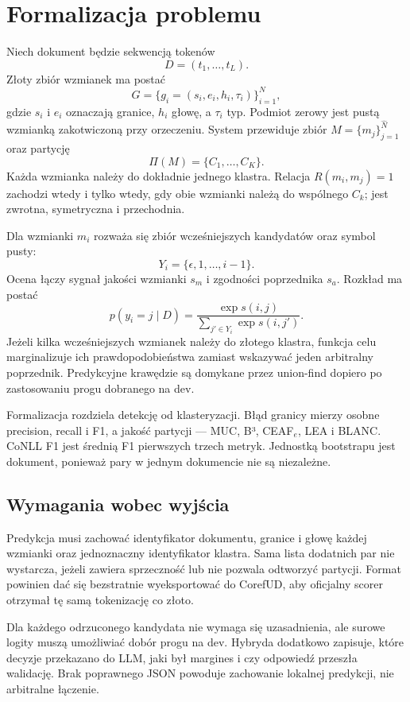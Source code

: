 \section{Formalizacja problemu}
\label{sec:formalizacja}

Niech dokument będzie sekwencją tokenów
\[
D=(t_1,\ldots,t_L).
\]
Złoty zbiór wzmianek ma postać
\[
G=\{g_i=(s_i,e_i,h_i,\tau_i)\}_{i=1}^{N},
\]
gdzie $s_i$ i $e_i$ oznaczają granice, $h_i$ głowę, a $\tau_i$ typ. Podmiot zerowy jest pustą wzmianką zakotwiczoną przy orzeczeniu. System przewiduje zbiór $M=\{m_j\}_{j=1}^{\hat N}$ oraz partycję
\[
\Pi(M)=\{C_1,\ldots,C_K\}.
\]
Każda wzmianka należy do dokładnie jednego klastra. Relacja $R(m_i,m_j)=1$ zachodzi wtedy i tylko wtedy, gdy obie wzmianki należą do wspólnego $C_k$; jest zwrotna, symetryczna i przechodnia.

Dla wzmianki $m_i$ rozważa się zbiór wcześniejszych kandydatów oraz symbol pusty:
\[
Y_i=\{\epsilon,1,\ldots,i-1\}.
\]
Ocena łączy sygnał jakości wzmianki $s_m$ i zgodności poprzednika $s_a$. Rozkład ma postać
\[
p(y_i=j\mid D)=
\frac{\exp s(i,j)}
{\sum_{j'\in Y_i}\exp s(i,j')}.
\]
Jeżeli kilka wcześniejszych wzmianek należy do złotego klastra, funkcja celu marginalizuje ich prawdopodobieństwa zamiast wskazywać jeden arbitralny poprzednik. Predykcyjne krawędzie są domykane przez union-find dopiero po zastosowaniu progu dobranego na dev.

Formalizacja rozdziela detekcję od klasteryzacji. Błąd granicy mierzy osobne precision, recall i F1, a jakość partycji --- MUC, B³, CEAF$_e$, LEA i BLANC. CoNLL F1 jest średnią F1 pierwszych trzech metryk. Jednostką bootstrapu jest dokument, ponieważ pary w jednym dokumencie nie są niezależne.

\subsection{Wymagania wobec wyjścia}

Predykcja musi zachować identyfikator dokumentu, granice i głowę każdej wzmianki oraz jednoznaczny identyfikator klastra. Sama lista dodatnich par nie wystarcza, jeżeli zawiera sprzeczność lub nie pozwala odtworzyć partycji. Format powinien dać się bezstratnie wyeksportować do CorefUD, aby oficjalny scorer otrzymał tę samą tokenizację co złoto.

Dla każdego odrzuconego kandydata nie wymaga się uzasadnienia, ale surowe logity muszą umożliwiać dobór progu na dev. Hybryda dodatkowo zapisuje, które decyzje przekazano do LLM, jaki był margines i czy odpowiedź przeszła walidację. Brak poprawnego JSON powoduje zachowanie lokalnej predykcji, nie arbitralne łączenie.


